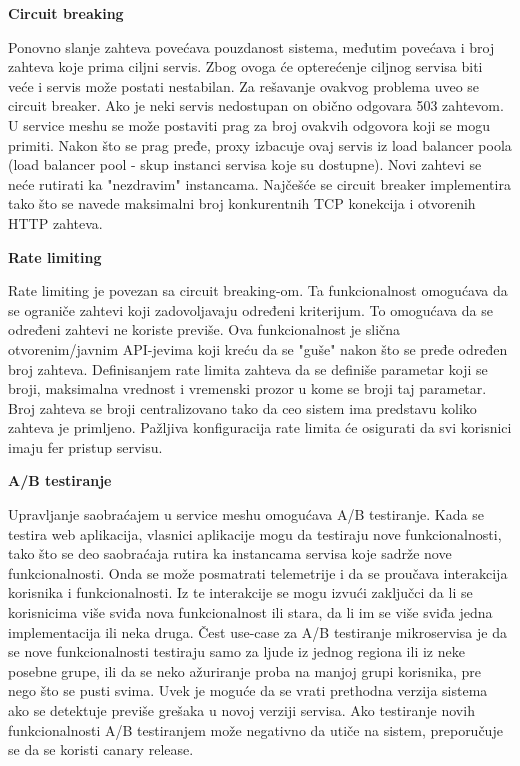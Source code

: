 \documentclass[a4paper,12pt]{report}
\begin{document}
\textbf{Circuit breaking}\newline

Ponovno slanje zahteva povećava pouzdanost sistema, međutim povećava i broj zahteva koje prima ciljni servis. Zbog ovoga će opterećenje ciljnog servisa biti veće i servis može postati nestabilan. Za rešavanje ovakvog problema uveo se circuit breaker. Ako je neki servis nedostupan on obično odgovara 503 zahtevom. U service meshu se može postaviti prag za broj ovakvih odgovora koji se mogu primiti. Nakon što se prag pređe, proxy izbacuje ovaj servis iz load balancer poola (load balancer pool - skup instanci servisa koje su dostupne). Novi zahtevi se neće rutirati ka "nezdravim" instancama. Najčešće se circuit breaker implementira tako što se navede maksimalni broj konkurentnih TCP konekcija i otvorenih HTTP zahteva. \newline

\textbf{Rate limiting}\newline

Rate limiting je povezan sa circuit breaking-om. Ta funkcionalnost omogućava da se ograniče zahtevi koji zadovoljavaju određeni kriterijum. To omogućava da se određeni zahtevi ne koriste previše. Ova funkcionalnost je slična otvorenim/javnim API-jevima koji kreću da se "guše" nakon što se pređe određen broj zahteva. Definisanjem rate limita zahteva da se definiše parametar koji se broji, maksimalna vrednost i vremenski prozor u kome se broji taj parametar. Broj zahteva se broji centralizovano tako da ceo sistem ima predstavu koliko zahteva je primljeno. Pažljiva konfiguracija rate limita će osigurati da svi korisnici imaju fer pristup servisu. \newline

\textbf{A/B testiranje}\newline

Upravljanje saobraćajem u service meshu omogućava A/B testiranje. Kada se testira web aplikacija, vlasnici aplikacije mogu da testiraju nove funkcionalnosti, tako što se deo saobraćaja rutira ka instancama servisa koje sadrže nove funkcionalnosti. Onda se može posmatrati telemetrije i da se proučava interakcija korisnika i funkcionalnosti. Iz te interakcije se mogu izvući zaključci da li se korisnicima više sviđa nova funkcionalnost ili stara, da li im se više sviđa jedna implementacija ili neka druga. Čest use-case za A/B testiranje mikroservisa je da se nove funkcionalnosti testiraju samo za ljude iz jednog regiona ili iz neke posebne grupe, ili da se neko ažuriranje proba na manjoj grupi korisnika, pre nego što se pusti svima. Uvek je moguće da se vrati prethodna verzija sistema ako se detektuje previše grešaka u novoj verziji servisa. Ako testiranje novih funkcionalnosti A/B testiranjem može negativno da utiče na sistem, preporučuje se da se koristi canary release.\newline
\end{document}
